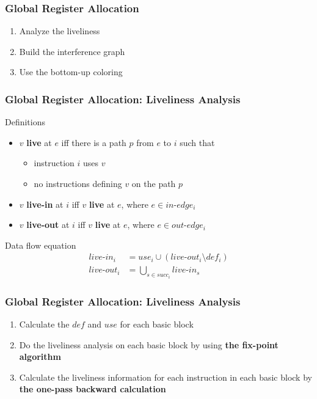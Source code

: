 \documentclass{beamer}
\begin{document}
	\begin{frame}
		\frametitle{Global Register Allocation}
		\begin{enumerate}
			\item Analyze the liveliness
			\item Build the interference graph
			\item Use the bottom-up coloring
		\end{enumerate}
	\end{frame}
	
	\begin{frame}
		\frametitle{Global Register Allocation: Liveliness Analysis}
		\begin{block}{Definitions}
			\begin{itemize}
				\item $v$ \textbf{live} at $e$ iff there is a path $p$ from $e$ to $i$ such that
				\begin{itemize}
					\item instruction $i$ uses $v$
					\item no instructions defining $v$ on the path $p$
				\end{itemize}
				\item $v$ \textbf{live-in} at $i$ iff $v$ \textbf{live} at $e$, where $e \in in\text{-}edge_i$
				\item $v$ \textbf{live-out} at $i$ iff $v$ \textbf{live} at $e$, where $e \in out\text{-}edge_i$ 
			\end{itemize}
		\end{block}
		\pause
		\begin{alertblock}{Data flow equation}
			\[
			\begin{aligned}
				live\text{-}in_i &= use_i \cup \left(live\text{-}out_i \setminus def_i\right)\\
				live\text{-}out_i &= \bigcup_{s \in succ_i}{live\text{-}in_s}
			\end{aligned}
			\]
		\end{alertblock}
	\end{frame}

	\begin{frame}
		\frametitle{Global Register Allocation: Liveliness Analysis}
		\begin{enumerate}
			\item Calculate the $def$ and $use$ for each basic block
			\item Do the liveliness analysis on each basic block by using \textbf{the fix-point algorithm}
			\item Calculate the liveliness information for each instruction in each basic block by \textbf{the one-pass backward calculation}
		\end{enumerate}
	\end{frame}
\end{document}
